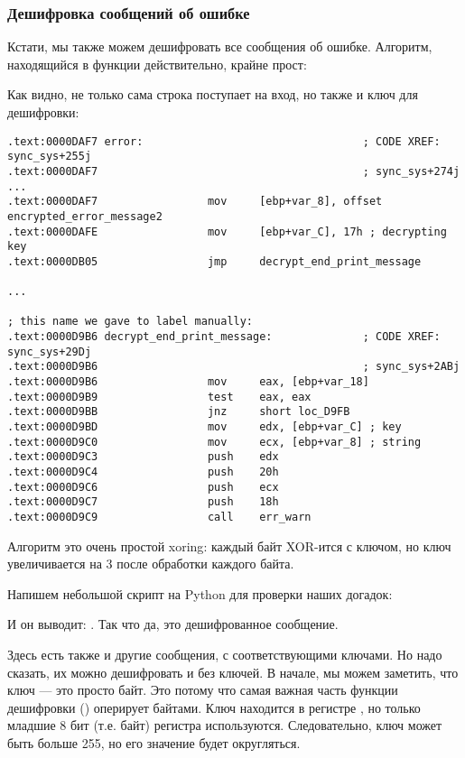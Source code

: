 \subsubsection{Дешифровка сообщений об ошибке}

Кстати, мы также можем дешифровать все сообщения об ошибке.
Алгоритм, находящийся в функции  
действительно, крайне прост:



Как видно, не только сама строка поступает на вход, но также и ключ для дешифровки:

\begin{lstlisting}
.text:0000DAF7 error:                                  ; CODE XREF: sync_sys+255j
.text:0000DAF7                                         ; sync_sys+274j ...
.text:0000DAF7                 mov     [ebp+var_8], offset encrypted_error_message2
.text:0000DAFE                 mov     [ebp+var_C], 17h ; decrypting key
.text:0000DB05                 jmp     decrypt_end_print_message

...

; this name we gave to label manually:
.text:0000D9B6 decrypt_end_print_message:              ; CODE XREF: sync_sys+29Dj
.text:0000D9B6                                         ; sync_sys+2ABj
.text:0000D9B6                 mov     eax, [ebp+var_18]
.text:0000D9B9                 test    eax, eax
.text:0000D9BB                 jnz     short loc_D9FB
.text:0000D9BD                 mov     edx, [ebp+var_C] ; key
.text:0000D9C0                 mov     ecx, [ebp+var_8] ; string
.text:0000D9C3                 push    edx
.text:0000D9C4                 push    20h
.text:0000D9C6                 push    ecx
.text:0000D9C7                 push    18h
.text:0000D9C9                 call    err_warn
\end{lstlisting}

Алгоритм это очень простой \gls{xoring}: 
каждый байт XOR-ится с ключом, но ключ увеличивается на 3 после обработки каждого байта.

Напишем небольшой скрипт на Python для проверки наших догадок:



И он выводит: .
Так что да, это дешифрованное сообщение.

Здесь есть также и другие сообщения, с соответствующими ключами.
Но надо сказать, их можно дешифровать и без ключей.
В начале, мы можем заметить, что ключ --- это просто байт.
Это потому что самая важная часть функции дешифровки
(\XOR) оперирует байтами. 
Ключ находится в регистре \ESI, но только младшие 8 бит
(т.е. байт) регистра используются.
Следовательно, ключ может быть больше 255, 
но его значение будет округляться.

